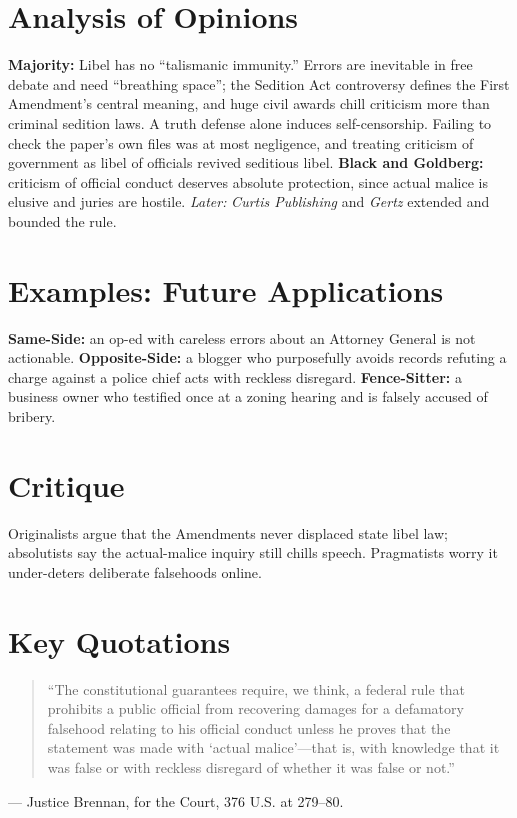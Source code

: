 \documentclass[12pt]{article}
\begin{document}
\section{Analysis of Opinions}
\textbf{Majority:} Libel has no ``talismanic immunity.'' Errors are inevitable in free debate and need ``breathing space''; the Sedition Act controversy defines the First Amendment's central meaning, and huge civil awards chill criticism more than criminal sedition laws. A truth defense alone induces self-censorship. Failing to check the paper's own files was at most negligence, and treating criticism of government as libel of officials revived seditious libel. \textbf{Black and Goldberg:} criticism of official conduct deserves absolute protection, since actual malice is elusive and juries are hostile. \emph{Later:} \textit{Curtis Publishing} and \textit{Gertz} extended and bounded the rule.

\section{Examples: Future Applications}
\textbf{Same-Side:} an op-ed with careless errors about an Attorney General is not actionable. \textbf{Opposite-Side:} a blogger who purposefully avoids records refuting a charge against a police chief acts with reckless disregard. \textbf{Fence-Sitter:} a business owner who testified once at a zoning hearing and is falsely accused of bribery.

\section{Critique}
Originalists argue that the Amendments never displaced state libel law; absolutists say the actual-malice inquiry still chills speech. Pragmatists worry it under-deters deliberate falsehoods online.

\section{Key Quotations}
\begin{quote}
``The constitutional guarantees require, we think, a federal rule that prohibits a public official from recovering damages for a defamatory falsehood relating to his official conduct unless he proves that the statement was made with `actual malice'---that is, with knowledge that it was false or with reckless disregard of whether it was false or not.''
\end{quote}
\noindent --- Justice Brennan, for the Court, 376 U.S. at 279--80.
\end{document}

